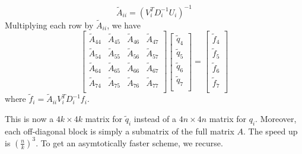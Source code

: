 \begin{equation*}
    \widetilde{A}_{ii} = (V^T_i D_i^{-1}U_i)^{-1}
\end{equation*}
Multiplying each row by  $\widetilde{A}_{ii}$, we have
\begin{equation*}
        \begin{bmatrix}
        \widetilde{A}_{44}    & \widetilde{A}_{45} & \widetilde{A}_{46} & \widetilde{A}_{47} \\
        \widetilde{A}_{54} & \widetilde{A}_{55}     & \widetilde{A}_{56} & \widetilde{A}_{57} \\
        \widetilde{A}_{64} & \widetilde{A}_{65} & \widetilde{A}_{66}     & \widetilde{A}_{67} \\
        \widetilde{A}_{74} & \widetilde{A}_{75} & \widetilde{A}_{76} &    \widetilde{A}_{77}     \\
    \end{bmatrix}
    \begin{bmatrix}
        \widetilde{q}_4 \\
        \widetilde{q}_5 \\
        \widetilde{q}_6 \\
        \widetilde{q}_7 \\
    \end{bmatrix}
    =
    \begin{bmatrix}
        \widetilde{f}_4 \\
        \widetilde{f}_5 \\
        \widetilde{f}_6 \\
        \widetilde{f}_7 \\
    \end{bmatrix}
\end{equation*}
where $\widetilde{f}_i = \widetilde{A}_{ii}V^T_iD_i^{-1}f_i$.

This is now a $4k \times 4k$ matrix for $\widetilde{q}_i$ instead of a $4n \times 4n$ matrix for $q_i$. Moreover, each off-diagonal block is simply a submatrix of the full matrix $A$. The speed up is $(\frac{n}{k})^3$. To get an asymtotically faster scheme, we recurse.

